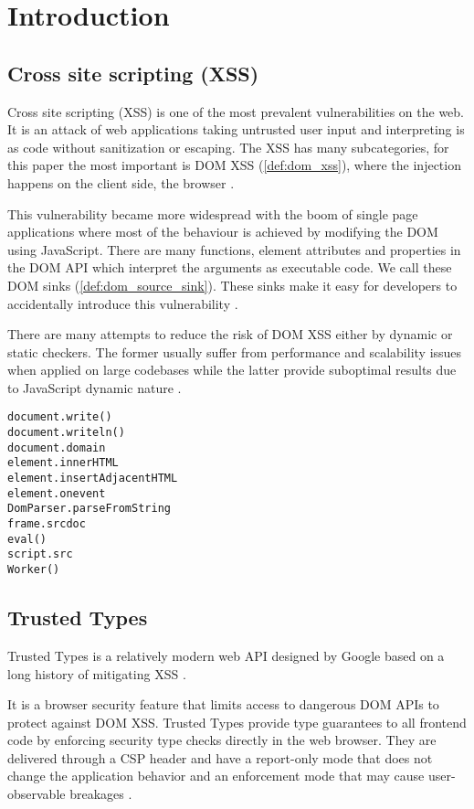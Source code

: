 \chapter{Introduction}

\section{Cross site scripting (XSS)}

Cross site scripting (XSS) is one of the most prevalent vulnerabilities on the web. It is an attack
of web applications taking untrusted user input and interpreting is as code without sanitization or
escaping. The XSS has many subcategories, for this paper the most important is DOM XSS
(\ref{def:dom_xss}), where the injection happens on the client side, the browser
\cite{tt_web_framework_paper}.

This vulnerability became more widespread with the boom of single page applications where most of
the behaviour is achieved by modifying the DOM using JavaScript. There are many functions, element
attributes and properties in the DOM API which interpret the arguments as executable code. We call
these DOM sinks (\ref{def:dom_source_sink}). These sinks make it easy for developers to accidentally
introduce this vulnerability \cite{tt_web_framework_paper}.

There are many attempts to reduce the risk of DOM XSS either by dynamic or static checkers. The
former usually suffer from performance and scalability issues when applied on large codebases while
the latter provide suboptimal results due to JavaScript dynamic nature
\cite{tt_web_framework_paper}.

\bigskip
\begin{lstlisting}[language={}, caption=Examples of DOM XSS attack vectors \cite{dom_xss_portswigger} \cite{tt_web_framework_paper}]
document.write()
document.writeln()
document.domain
element.innerHTML
element.insertAdjacentHTML
element.onevent
DomParser.parseFromString
frame.srcdoc
eval()
script.src
Worker()
\end{lstlisting}

\section{Trusted Types}

Trusted Types is a relatively modern web API designed by Google based on a long history of
mitigating XSS \cite{tt_design_history}.

It is a browser security feature that limits access to dangerous DOM APIs to protect against DOM
XSS. Trusted Types provide type guarantees to all frontend code by enforcing security type checks
directly in the web browser. They are delivered through a CSP header and have a report-only mode
that does not change the application behavior and an enforcement mode that may cause user-observable
breakages \cite{tt_background}.

